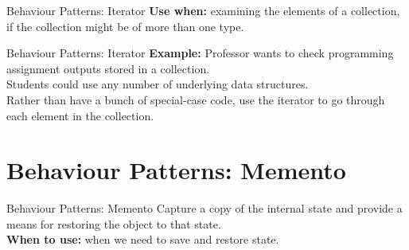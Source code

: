 \documentclass[14pt,aspectratio=169]{beamer}
\begin{document}
\begin{frame}{Behaviour Patterns: Iterator}
\large
\textbf{Use when:} examining the elements of a collection, if the collection might be of more than one type.
\end{frame}



\begin{frame}{Behaviour Patterns: Iterator}
\large
\textbf{Example:} Professor wants to check programming assignment outputs stored in a collection. \\
\vspace{1em}
Students could use any number of underlying data structures. \\
\vspace{1em}
Rather than have a bunch of special-case code, use the iterator to go through each element in the collection.
\end{frame}



\section*{Behaviour Patterns: Memento}



\begin{frame}{Behaviour Patterns: Memento}
Capture a copy of the internal state and provide a means for restoring the object to that state. \\
\vspace{1em}
\textbf{When to use:} when we need to save and restore state. 
\end{frame}
\end{document}
